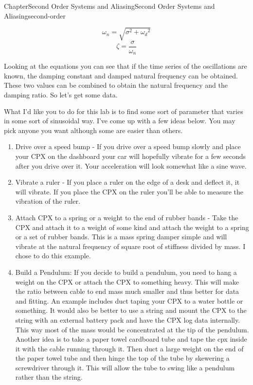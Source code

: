 \documentclass[oneside,10pt,]{book}
\numberwithin{equation}{section}
\begin{document}
\begin{chapterptx}{Chapter}{Second Order Systems and Aliasing}{}{Second Order Systems and Aliasing}{}{}{second-order}
\begin{introduction}{}
\begin{equation}
\omega_n = \sqrt{\sigma^2 + {\omega_d}^2}\label{second-order-2-4-4}
\end{equation}
%
\begin{equation}
\zeta = \frac{\sigma}{\omega_n}\label{second-order-2-4-5}
\end{equation}
%
\par
Looking at the equations you can see that if the time series of the oscillations are known, the damping constant and damped natural frequency can be obtained. These two values can be combined to obtain the natural frequency and the damping ratio. So let's get some data.%
\par
What I'd like you to do for this lab is to find some sort of parameter that varies in some sort of sinusoidal way. I've come up with a few ideas below. You may pick anyone you want although some are easier than others.%
\begin{enumerate}
\item{}Drive over a speed bump - If you drive over a speed bump slowly and place your CPX on the dashboard your car will hopefully vibrate for a few seconds after you drive over it. Your acceleration will look somewhat like a sine wave.%
\item{}Vibrate a ruler - If you place a ruler on the edge of a desk and deflect it, it will vibrate. If you place the CPX on the ruler you'll be able to measure the vibration of the ruler.%
\item{}Attach CPX to a spring or a weight to the end of rubber bands - Take the CPX and attach it to a weight of some kind and attach the weight to a spring or a set of rubber bands. This is a mass spring damper simple and will vibrate at the natural frequency of square root of stiffness divided by mass. I chose to do this example.%
\item{}Build a Pendulum: If you decide to build a pendulum, you need to hang a weight on the CPX or attach the CPX to something heavy. This will make the ratio between cable to end mass much smaller and thus better for data and fitting. An example includes  duct taping your CPX to a water bottle or something. It would also be better to use a string and mount the CPX to the string with an external battery pack and have the CPX log data internally. This way most of the mass would be concentrated at the tip of the pendulum. Another idea is to take a paper towel cardboard tube and tape the cpx inside it with the cable running through it. Then duct a large weight on the end of the paper towel tube and then hinge the top of the tube by skewering a screwdriver through it. This will allow the tube to swing like a pendulum rather than the string.%

\end{enumerate}
\end{introduction}
\end{chapterptx}
\end{document}

